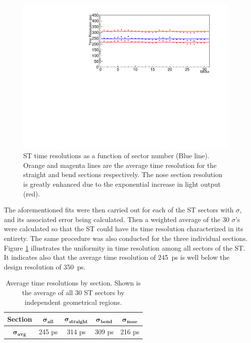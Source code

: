 \begin{figure}[!htb]
		\centering
		\includegraphics[width=1.08\columnwidth]{performance/figs/TR_All}
		\caption{ST time resolutions as a function of sector number (Blue line). Orange and magenta lines are the average time resolution for the straight and bend sections respectively. The nose section resolution is greatly enhanced due to the exponential increase in light output (red).}
		\label{fig:timeresallinset}
	\end{figure}		
The aforementioned fits were then carried out for each of the ST sectors with $\sigma$, and its associated error being calculated.  Then a weighted average of the 30 $\sigma$'s were calculated so that the ST could have its time resolution characterized in its entirety.  The same procedure was also conducted for the three individual sections.  Figure \ref{fig:timeresallinset} illustrates the uniformity in time resolution among all sectors of the ST. It indicates also that the average time resolution of 245~ps is well below the design resolution of 350~ps.
\begin{table}[h]
	\centering
	\begin{tabular}{|c|c|c|c|c|}
		\hline  \textbf{Section} & $\mathbf{\sigma_{all}}$ & $\mathbf{\sigma_{straight}}$ & $\mathbf{\sigma_{bend}}$ & $\mathbf{\sigma_{nose}}$ \\ 
		\hline $\mathbf{\sigma_{avg}}$ & 245 ps & 314 ps & 309 ps & 216 ps \\ 
		\hline 
	\end{tabular}
	\caption[Average time resolutions by section]{Average time resolutions by section. Shown is the average of all 30 ST sectors by independent geometrical regions.}
	\label{tab:time_res_section}
\end{table}

